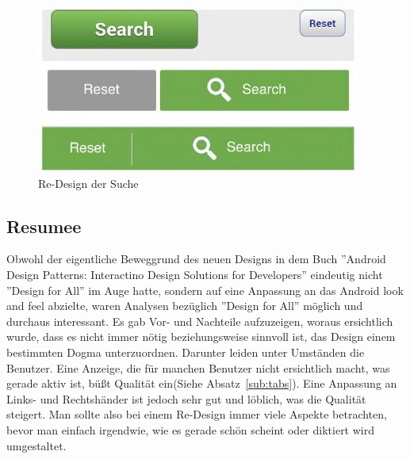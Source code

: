 \begin{figure}[h]
 \centering
 \includegraphics[height=0.08\textheight]{img/search.png}
 \caption{Re-Design der Suche}
 \label{fig:search}
\end{figure}

\subsection{Resumee}
\label{sub:resumee}
Obwohl der eigentliche Beweggrund des neuen Designs in dem Buch ''Android Design Patterns: Interactino Design Solutions for Developers'' eindeutig nicht ''Design for All'' im Auge hatte, sondern auf eine Anpassung an das Android look and feel abzielte, waren Analysen bezüglich ''Design for All'' möglich und durchaus interessant. Es gab Vor- und Nachteile aufzuzeigen, woraus ersichtlich wurde, dass es nicht immer nötig beziehungsweise sinnvoll ist, das Design einem bestimmten Dogma unterzuordnen. Darunter leiden unter Umständen die Benutzer. Eine Anzeige, die für manchen Benutzer nicht ersichtlich macht, was gerade aktiv ist, büßt Qualität ein(Siehe Absatz~\ref{sub:tabs}). Eine Anpassung an Links- und Rechtshänder ist jedoch sehr gut und löblich, was die Qualität steigert. Man sollte also bei einem Re-Design immer viele Aspekte betrachten, bevor man einfach irgendwie, wie es gerade schön scheint oder diktiert wird umgestaltet.
